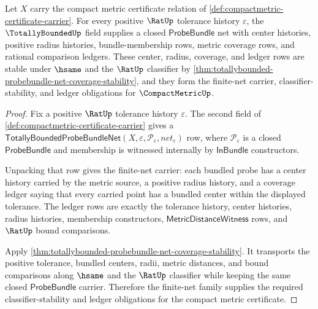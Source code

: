 \begin{theorem}
\label{thm:compactmetric-totallybounded-net-obligation}
Let $X$ carry the compact metric certificate relation of
\autoref{def:compactmetric-certificate-carrier}. For every positive
$\RatUp$ tolerance history $\varepsilon$, the $\TotallyBoundedUp$ field
supplies a closed $\mathsf{ProbeBundle}$ net with center histories,
positive radius histories, bundle-membership rows, metric coverage rows, and
rational comparison ledgers. These center, radius, coverage, and ledger rows
are stable under $\hsame$ and the $\RatUp$ classifier by
\autoref{thm:totallybounded-probebundle-net-coverage-stability}, and they
form the finite-net carrier, classifier-stability, and ledger obligations for
$\CompactMetricUp$.
\end{theorem}
\begin{proof}
Fix a positive $\RatUp$ tolerance history $\varepsilon$. The second field of
\autoref{def:compactmetric-certificate-carrier} gives a
$\mathsf{TotallyBoundedProbeBundleNet}(X,\varepsilon,\mathcal{P}_{\varepsilon},net_{\varepsilon})$
row, where $\mathcal{P}_{\varepsilon}$ is a closed
$\mathsf{ProbeBundle}$ and membership is witnessed internally by
$\mathsf{InBundle}$ constructors.

Unpacking that row gives the finite-net carrier: each bundled probe has a
center history carried by the metric source, a positive radius history, and a
coverage ledger saying that every carried point has a bundled center within
the displayed tolerance. The ledger rows are exactly the tolerance history,
center histories, radius histories, membership constructors,
$\mathsf{MetricDistanceWitness}$ rows, and $\RatUp$ bound comparisons.

Apply
\autoref{thm:totallybounded-probebundle-net-coverage-stability}. It transports
the positive tolerance, bundled centers, radii, metric distances, and bound
comparisons along $\hsame$ and the $\RatUp$ classifier while keeping the same
closed $\mathsf{ProbeBundle}$ carrier. Therefore the finite-net family
supplies the required classifier-stability and ledger obligations for the
compact metric certificate.
\end{proof}

